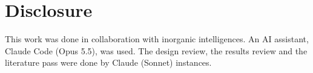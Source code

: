 \documentclass[reprint,amsmath,amssymb,aps,superscriptaddress,nofootinbib]{revtex4-2}
\begin{document}
\section*{Disclosure}
This work was done in collaboration with inorganic intelligences. An AI assistant, Claude Code (Opus 5.5), was used. The design review, the results review and the literature pass were done by Claude (Sonnet) instances.


\end{document}
